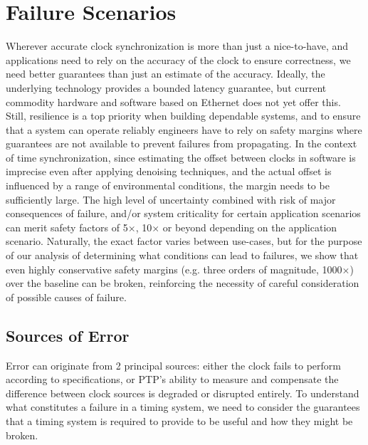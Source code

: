 \newcommand{\safetyMargin}{1000$\times$}

\section{Failure Scenarios}
\label{sec:failure_scenarios}

Wherever accurate clock synchronization is more than just a nice-to-have, and applications need to rely on the accuracy of the clock to ensure correctness, we need better guarantees than just an estimate of the accuracy.
Ideally, the underlying technology provides a bounded latency guarantee, but current commodity hardware and software based on Ethernet does not yet offer this.
Still, resilience is a top priority when building dependable systems, and to ensure that a system can operate reliably engineers have to rely on safety margins where guarantees are not available to prevent failures from propagating.
In the context of time synchronization, since estimating the offset between clocks in software is imprecise even after applying denoising techniques, and the actual offset is influenced by a range of environmental conditions, the margin needs to be sufficiently large.
The high level of uncertainty combined with risk of major consequences of failure, and/or system criticality for certain application scenarios can merit safety factors of 5$\times$, 10$\times$ or beyond depending on the application scenario.
Naturally, the exact factor varies between use-cases, but for the purpose of our analysis of determining what conditions can lead to failures, we show that even highly conservative safety margins (e.g. three orders of magnitude, \safetyMargin) over the baseline can be broken, reinforcing the necessity of careful consideration of possible causes of failure.

\subsection{Sources of Error}
Error can originate from 2 principal sources: either the clock fails to perform according to specifications, or PTP's ability to measure and compensate the difference between clock sources is degraded or disrupted entirely. To understand what constitutes a failure in a timing system, we need to consider the guarantees that a timing system is required to provide to be useful and how they might be broken.

